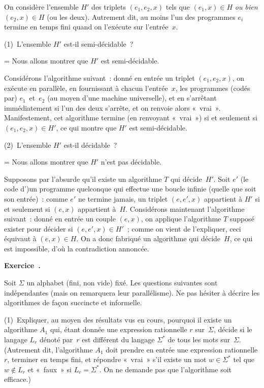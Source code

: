 \documentclass[12pt,a4paper]{article}
\theoremstyle{definition}
\newcommand\exercice{%
\refstepcounter{comcnt}\bigskip\noindent\textbf{Exercice~\thecomcnt.}}
\newif\ifcorrige
\newenvironment{corrige}%
{\ifcorrige\relax\else\setbox0=\vbox\bgroup\fi%
\smallbreak\footnotesize\noindent{\underbar{\textit{Corrigé.}}\quad}}
{{\hbox{}\nobreak\hfill\checkmark}%
\ifcorrige\relax\else\egroup\fi\par}
\begin{document}
On considère l'ensemble $H'$ des triplets $(e_1,e_2,x)$ tels que
$(e_1,x) \in H$ \emph{ou bien} $(e_2,x) \in H$ (ou les deux).
Autrement dit, au moins l'un des programmes $e_i$ termine en temps
fini quand on l'exécute sur l'entrée $x$.

(1) L'ensemble $H'$ est-il semi-décidable ?

\begin{corrige}
Nous allons montrer que $H'$ est semi-décidable.

Considérons l'algorithme suivant : donné en entrée un triplet
$(e_1,e_2,x)$, on exécute en parallèle, en fournissant à chacun
l'entrée $x$, les programmes (codés par) $e_1$ et $e_2$ (au moyen
d'une machine universelle), et en s'arrêtant immédiatement si l'un des
deux s'arrête, et on renvoie alors « vrai ».  Manifestement, cet
algorithme termine (en renvoyant « vrai ») si et seulement si
$(e_1,e_2,x) \in H'$, ce qui montre que $H'$ est semi-décidable.
\end{corrige}

(2) L'ensemble $H'$ est-il décidable ?

\begin{corrige}
Nous allons montrer que $H'$ n'est pas décidable.

Supposons par l'absurde qu'il existe un algorithme $T$ qui
décide $H'$.  Soit $e'$ (le code d')un programme quelconque qui
effectue une boucle infinie (quelle que soit son entrée) : comme $e'$
ne termine jamais, un triplet $(e,e',x)$ appartient à $H'$ si et
seulement si $(e,x)$ appartient à $H$.  Considérons maintenant
l'algorithme suivant : donné en entrée un couple $(e,x)$, on applique
l'algorithme $T$ supposé exister pour décider si $(e,e',x) \in H'$ ;
comme on vient de l'expliquer, ceci équivaut à $(e,x) \in H$.  On a
donc fabriqué un algorithme qui décide $H$, ce qui est impossible,
d'où la contradiction annoncée.
\end{corrige}

%

\exercice

Soit $\Sigma$ un alphabet (fini, non vide) fixé.  Les questions
suivantes sont indépendantes (mais on remarquera leur parallélisme).
Ne pas hésiter à décrire les algorithmes de façon succincte et
informelle.

(1) Expliquer, au moyen des résultats vus en cours, pourquoi il existe
un algorithme $A_1$ qui, étant donnée une expression rationnelle $r$
sur $\Sigma$, décide si le langage $L_r$ dénoté par $r$ est différent
du langage $\Sigma^*$ de tous les mots sur $\Sigma$.  (Autrement dit,
l'algorithme $A_1$ doit prendre en entrée une expression rationnelle
$r$, terminer en temps fini, et répondre « vrai » s'il existe un mot
$w\in\Sigma^*$ tel que $w\not\in L_r$ et « faux » si $L_r = \Sigma^*$.
On ne demande pas que l'algorithme soit efficace.)
\end{document}
